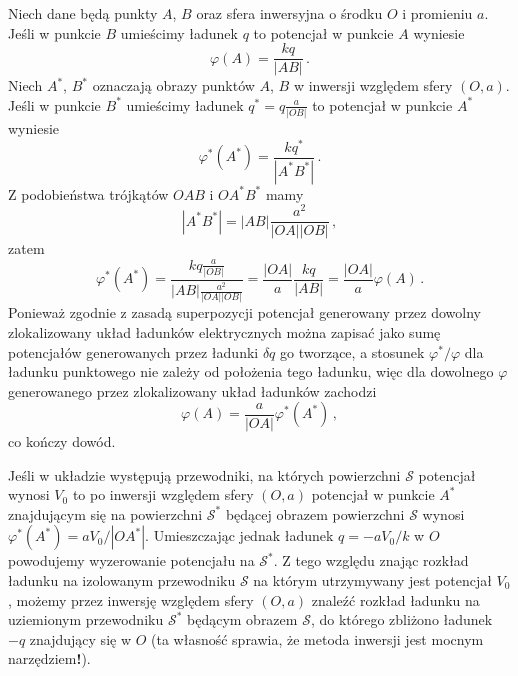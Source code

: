 \documentclass[../main.tex]{subfiles}
\begin{document}
Niech dane będą punkty \(A\), \(B\) oraz sfera inwersyjna o środku \(O\) i promieniu \(a\). Jeśli w punkcie \(B\) umieścimy ładunek \(q\) to potencjał w punkcie \(A\) wyniesie
\begin{equation*}
    \varphi(A)=\frac{kq}{|AB|}\,.
\end{equation*}
Niech \(A^*\), \(B^*\) oznaczają obrazy punktów \(A\), \(B\) w inwersji względem sfery \((O,a)\). Jeśli w punkcie \(B^*\) umieścimy ładunek \(q^*=q\frac{a}{|OB|}\) to potencjał w punkcie \(A^*\) wyniesie
\begin{equation*}
    \varphi^*(A^*)=\frac{kq^*}{|A^*B^*|}\,.
\end{equation*}
Z podobieństwa trójkątów \(OAB\) i \(OA^*B^*\) mamy
\begin{equation*}
    |A^*B^*|=|AB|\frac{a^2}{|OA| |OB|}\,,
\end{equation*}
zatem
\begin{equation*}
    \varphi^*(A^*)=\frac{kq\frac{a}{|OB|}}{|AB|\frac{a^2}{|OA| |OB|}}=\frac{|OA|}{a}\frac{kq}{|AB|}=\frac{|OA|}{a}\varphi(A)\,.
\end{equation*}
Ponieważ zgodnie z zasadą superpozycji potencjał generowany przez dowolny zlokalizowany układ ładunków elektrycznych można zapisać jako sumę potencjałów generowanych przez ładunki \(\delta q\) go tworzące, a stosunek \(\varphi^*/\varphi\) dla ładunku punktowego nie zależy od położenia tego ładunku, więc dla dowolnego \(\varphi\) generowanego przez zlokalizowany układ ładunków zachodzi
\begin{equation*}
            \varphi(A)=\frac{a}{|OA|}\varphi^*(A^*)\,,
\end{equation*}
co kończy dowód.
\medskip

\medskip

Jeśli w układzie występują przewodniki, na których powierzchni \(\mathcal{S}\) potencjał wynosi \(V_0\) to po inwersji względem sfery \((O,a)\) potencjał w punkcie \(A^*\) znajdującym się na powierzchni \(\mathcal{S}^*\) będącej obrazem powierzchni \(\mathcal{S}\) wynosi \(\varphi^*(A^*)=aV_0/|OA^*|\). Umieszczając jednak ładunek \(q=-aV_0/k\) w \(O\) powodujemy wyzerowanie potencjału na \(\mathcal{S}^*\). Z tego względu znając rozkład ładunku na izolowanym przewodniku \(\mathcal{S}\) na którym utrzymywany jest potencjał \(V_0\), możemy przez inwersję względem sfery \((O,a)\) znaleźć rozkład ładunku na uziemionym przewodniku \(\mathcal{S}^*\) będącym obrazem \(\mathcal{S}\), do którego zbliżono ładunek \(-q\) znajdujący się w \(O\) (ta własność sprawia, że metoda inwersji jest mocnym narzędziem\textbf{!}).
\end{document}
